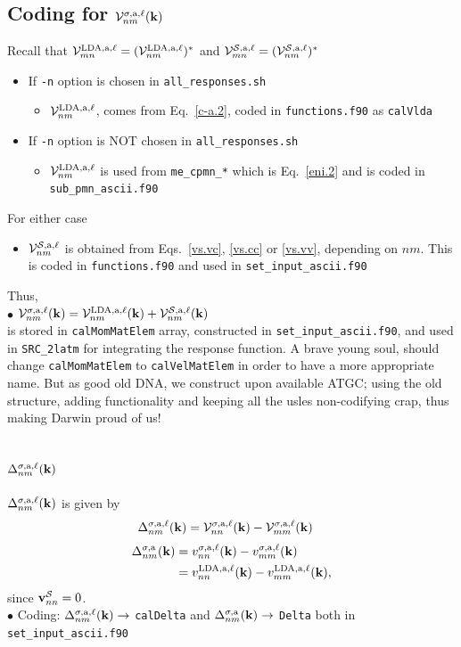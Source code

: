 \subsection{Coding for ${\mathbf{\cal V}}^{\sigma,\mathrm{a},\ell}_{nm}(\mathbf{k})$} 
Recall that 
${\mathbf{\cal V}}^{\mathrm{LDA},\mathrm{a},\ell}_{mn}=({\mathbf{\cal V}}^{\mathrm{LDA},\mathrm{a},\ell}_{nm})^*$
and 
${\mathbf{\cal V}}^{{\cal S},\mathrm{a},\ell}_{mn}=({\mathbf{\cal V}}^{{\cal S},\mathrm{a},\ell}_{nm})^*$ 
\begin{itemize}
\item If \verb=-n= option is chosen in \verb=all_responses.sh=
\begin{itemize}
\item ${\mathbf{\cal V}}^{\mathrm{LDA},\mathrm{a},\ell}_{nm}$, comes from
  Eq.~\eqref{c-a.2}, coded in \verb=functions.f90= as \verb=calVlda=
\end{itemize}
\item If \verb=-n= option is NOT chosen in \verb=all_responses.sh=
\begin{itemize}
\item ${\mathbf{\cal V}}^{\mathrm{LDA},\mathrm{a},\ell}_{nm}$ 
is used from \verb=me_cpmn_*=
  which is Eq.~\eqref{eni.2} and is coded in \verb=sub_pmn_ascii.f90=
\end{itemize}
\end{itemize}
For either case
\begin{itemize}
\item ${\mathbf{\cal V}}^{{\cal S},\mathrm{a},\ell}_{nm}$ 
is obtained from
  Eqs.~\eqref{vs.vc}, \eqref{vs.cc} or \eqref{vs.vv}, depending on
  $nm$. This is coded in \verb=functions.f90= and used in 
\verb=set_input_ascii.f90=  
\end{itemize}
Thus,\\
$\bullet$ 
${\mathbf{\cal V}}^{\sigma,\mathrm{a},\ell}_{nm}(\mathbf{k})={\mathbf{\cal V}}^{\mathrm{LDA},\mathrm{a},\ell}_{nm}(\mathbf{k})+{\mathbf{\cal V}}^{{\cal S},\mathrm{a},\ell}_{nm}(\mathbf{k})$\\ 
is stored in \verb=calMomMatElem=  
array, constructed in 
\verb=set_input_ascii.f90=, and used in \verb=SRC_2latm= for
integrating the response function. A brave young soul, should change   
\verb=calMomMatElem= to \verb=calVelMatElem= in order to have a more
appropriate name. But as good old DNA, we construct upon available
ATGC; using the old structure, adding functionality and  keeping all
the usles non-codifying crap, thus making Darwin
 proud of us! 

\subsection{$\Delta^{\sigma,\mathrm{a},\ell}_{nm}(\mathbf{k})$}
$\Delta^{\sigma,\mathrm{a},\ell}_{nm}(\mathbf{k})$  is given by
\begin{align}\label{caldelta}
\Delta^{\sigma,\mathrm{a},\ell}_{nm}(\mathbf{k})&={\mathbf{\cal V}}^{\sigma,\mathrm{a},\ell}_{nn}(\mathbf{k})-{\mathbf{\cal V}}^{\sigma,\mathrm{a},\ell}_{mm}(\mathbf{k})
\end{align}
\begin{align}\label{delta}
\Delta^{\sigma,\mathrm{a}}_{nm}(\mathbf{k}) &=v^{\sigma,\mathrm{a},\ell}_{nn}(\mathbf{k})-v^{\sigma,\mathrm{a},\ell}_{mm}(\mathbf{k})
\nonumber\\
&=v^{\mathrm{LDA},\mathrm{a},\ell}_{nn}(\mathbf{k})-v^{\mathrm{LDA},\mathrm{a},\ell}_{mm}(\mathbf{k})
,
\end{align}
since $\mathbf{v}^{\cal S}_{nn}=0$.\\
$\bullet$ Coding: $\Delta^{\sigma,\mathrm{a},\ell}_{nm}(\mathbf{k})\to$ \verb=calDelta= 
and
$\Delta^{\sigma,\mathrm{a}}_{nm}(\mathbf{k})\to$ \verb=Delta= both in \verb=set_input_ascii.f90= 

